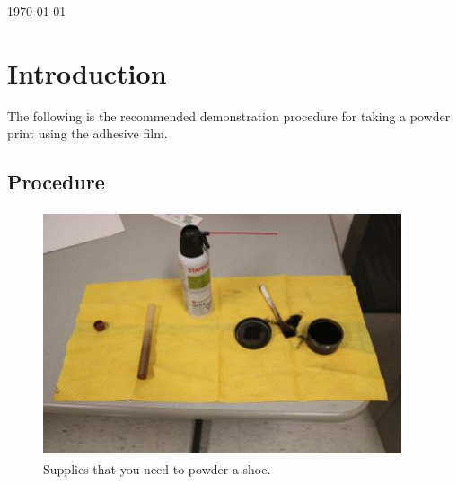 \begin{titlepage}


{\large \today}\\[2cm] %



 

\vfill %

\end{titlepage}




\section{Introduction}

The following is the recommended demonstration procedure for taking a powder print using the adhesive film.

\subsection{Procedure}
\begin{figure}[!htp]
\centering
\includegraphics[scale=0.75]{Powder}
\caption{Supplies that you need to powder a shoe.}
\label{img:Brush2}
\end{figure}

